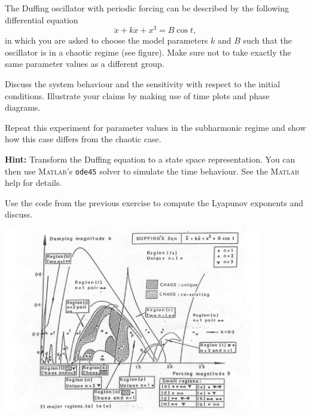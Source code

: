 \begin{Exercise}[name=The Duffing oscillator]

The Duffing oscillator with periodic forcing can be described by the following differential equation
\begin{equation}
\ddot{x}+k\dot{x}+x^3=B\cos t,
\end{equation}
in which you are asked to choose the model parameters $k$ and $B$ such that the oscillator is in a chaotic regime (see figure). Make sure not to take exactly the same parameter values as a different group. 

\Question Discuss the system behaviour and the sensitivity with respect to the initial conditions.  Illustrate your claims by making use of time plots and phase diagrams.

\Question Repeat this experiment for parameter values in the subharmonic regime and show how this case differs from the chaotic case.

\textbf{Hint: } Transform the Duffing equation to a state space representation. You can then use \textsc{Matlab}'s \verb$ode45$ solver to simulate the time behaviour. See the \textsc{Matlab} help for details.

\Question Use the code from the previous exercise to compute the Lyapunov exponents and discuss.

\vfill
\begin{center}
    \includegraphics[width=0.85\textwidth]{duffing_bis}
\end{center}
\vfill

\end{Exercise}

